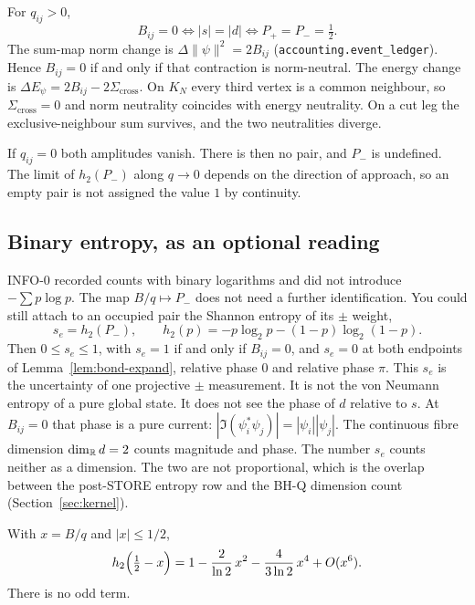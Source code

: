 \begin{corollary}
\label{cor:Bzero}
For \(q_{ij}>0\),
\[
B_{ij}=0
\iff |s|=|d|
\iff P_+=P_-=\tfrac12.
\]
The sum-map norm change is \(\Delta\|\psi\|^2=2B_{ij}\)
(\texttt{accounting.event\_ledger}).
Hence \(B_{ij}=0\) if and only if that contraction is norm-neutral.
The energy change is
\(\Delta E_\psi=2B_{ij}-2\Sigma_{\mathrm{cross}}\).
On \(K_N\) every third vertex is a common neighbour, so
\(\Sigma_{\mathrm{cross}}=0\) and norm neutrality coincides with energy neutrality.
On a cut leg the exclusive-neighbour sum survives, and the two neutralities diverge.
\end{corollary}

If \(q_{ij}=0\) both amplitudes vanish.
There is then no pair, and \(P_-\) is undefined.
The limit of \(h_2(P_-)\) along \(q\to 0\) depends on the direction of approach,
so an empty pair is not assigned the value \(1\) by continuity.

\subsection{Binary entropy, as an optional reading}

\begin{remark}
\label{rem:h2}
INFO-0 recorded counts with binary logarithms and did not introduce
\(-\sum p\log p\).
The map \(B/q\mapsto P_-\) does not need a further identification.
You could still attach to an occupied pair the Shannon entropy of its
\(\pm\) weight,
\begin{equation}
\label{eq:se}
s_e=h_2(P_-),\qquad
h_2(p)=-p\log_2 p-(1-p)\log_2(1-p).
\end{equation}
Then \(0\le s_e\le 1\), with \(s_e=1\) if and only if \(B_{ij}=0\),
and \(s_e=0\) at both endpoints of Lemma~\ref{lem:bond-expand},
relative phase \(0\) and relative phase \(\pi\).
This \(s_e\) is the uncertainty of one projective \(\pm\) measurement.
It is not the von Neumann entropy of a pure global state.
It does not see the phase of \(d\) relative to \(s\).
At \(B_{ij}=0\) that phase is a pure current:
\(|\Im(\psi_i^*\psi_j)|=|\psi_i||\psi_j|\).
The continuous fibre dimension \(\dim_{\mathbb{R}} d=2\) counts magnitude and phase.
The number \(s_e\) counts neither as a dimension.
The two are not proportional, which is the overlap between the
post-STORE entropy row and the BH-Q dimension count
(Section~\ref{sec:kernel}).
\end{remark}

\begin{lemma}
\label{lem:taylor}
With \(x=B/q\) and \(|x|\le 1/2\),
\[
h_2\Bigl(\tfrac12-x\Bigr)
=1-\frac{2}{\ln 2}\,x^2-\frac{4}{3\ln 2}\,x^4+O(x^6).
\]
There is no odd term.
\end{lemma}

